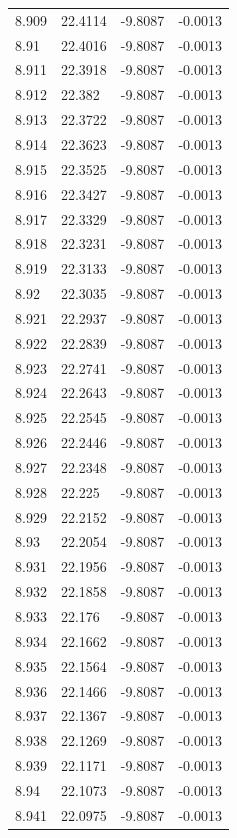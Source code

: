 \begin{tabular}{llll}
8.909 & 22.4114 & -9.8087 & -0.0013 \\
8.91 & 22.4016 & -9.8087 & -0.0013 \\
8.911 & 22.3918 & -9.8087 & -0.0013 \\
8.912 & 22.382 & -9.8087 & -0.0013 \\
8.913 & 22.3722 & -9.8087 & -0.0013 \\
8.914 & 22.3623 & -9.8087 & -0.0013 \\
8.915 & 22.3525 & -9.8087 & -0.0013 \\
8.916 & 22.3427 & -9.8087 & -0.0013 \\
8.917 & 22.3329 & -9.8087 & -0.0013 \\
8.918 & 22.3231 & -9.8087 & -0.0013 \\
8.919 & 22.3133 & -9.8087 & -0.0013 \\
8.92 & 22.3035 & -9.8087 & -0.0013 \\
8.921 & 22.2937 & -9.8087 & -0.0013 \\
8.922 & 22.2839 & -9.8087 & -0.0013 \\
8.923 & 22.2741 & -9.8087 & -0.0013 \\
8.924 & 22.2643 & -9.8087 & -0.0013 \\
8.925 & 22.2545 & -9.8087 & -0.0013 \\
8.926 & 22.2446 & -9.8087 & -0.0013 \\
8.927 & 22.2348 & -9.8087 & -0.0013 \\
8.928 & 22.225 & -9.8087 & -0.0013 \\
8.929 & 22.2152 & -9.8087 & -0.0013 \\
8.93 & 22.2054 & -9.8087 & -0.0013 \\
8.931 & 22.1956 & -9.8087 & -0.0013 \\
8.932 & 22.1858 & -9.8087 & -0.0013 \\
8.933 & 22.176 & -9.8087 & -0.0013 \\
8.934 & 22.1662 & -9.8087 & -0.0013 \\
8.935 & 22.1564 & -9.8087 & -0.0013 \\
8.936 & 22.1466 & -9.8087 & -0.0013 \\
8.937 & 22.1367 & -9.8087 & -0.0013 \\
8.938 & 22.1269 & -9.8087 & -0.0013 \\
8.939 & 22.1171 & -9.8087 & -0.0013 \\
8.94 & 22.1073 & -9.8087 & -0.0013 \\
8.941 & 22.0975 & -9.8087 & -0.0013 \\

\end{tabular}
